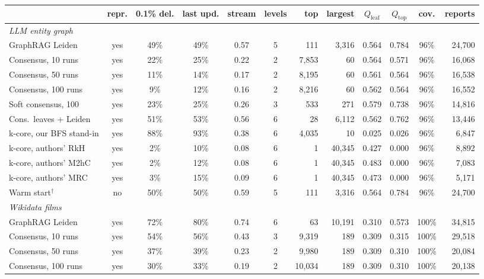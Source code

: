 \begin{tabular}{l c c c c c r r c c c r}
\toprule
 & repr. & 0.1\% del. & last upd. & stream & levels & top & largest & $Q_\mathrm{leaf}$ & $Q_\mathrm{top}$ & cov. & reports\\
\midrule
\multicolumn{12}{l}{\emph{LLM entity graph}}\\
GraphRAG Leiden & yes & 49\% & 49\% & 0.57 & 5 & 111 & 3{,}316 & 0.564 & 0.784 & 96\% & 24{,}700 \\
Consensus{,} 10 runs & yes & 22\% & 25\% & 0.22 & 2 & 7{,}853 & 60 & 0.564 & 0.571 & 96\% & 16{,}068 \\
Consensus{,} 50 runs & yes & 11\% & 14\% & 0.17 & 2 & 8{,}195 & 60 & 0.561 & 0.564 & 96\% & 16{,}538 \\
Consensus{,} 100 runs & yes & 9\% & 12\% & 0.16 & 2 & 8{,}216 & 60 & 0.562 & 0.564 & 96\% & 16{,}552 \\
Soft consensus{,} 100 & yes & 23\% & 25\% & 0.26 & 3 & 533 & 271 & 0.579 & 0.738 & 96\% & 14{,}816 \\
Cons.\ leaves + Leiden & yes & 51\% & 53\% & 0.56 & 6 & 28 & 6{,}112 & 0.562 & 0.762 & 96\% & 13{,}446 \\
k-core{,} our BFS stand-in & yes & 88\% & 93\% & 0.38 & 6 & 4{,}035 & 10 & 0.025 & 0.026 & 96\% & 6{,}847 \\
k-core{,} authors' RkH & yes & 2\% & 10\% & 0.08 & 6 & 1 & 40{,}345 & 0.427 & 0.000 & 96\% & 8{,}892 \\
k-core{,} authors' M2hC & yes & 2\% & 12\% & 0.08 & 6 & 1 & 40{,}345 & 0.483 & 0.000 & 96\% & 7{,}083 \\
k-core{,} authors' MRC & yes & 3\% & 15\% & 0.09 & 6 & 1 & 40{,}345 & 0.473 & 0.000 & 96\% & 5{,}171 \\
Warm start$^{\dagger}$ & no & 50\% & 50\% & 0.59 & 5 & 111 & 3{,}316 & 0.564 & 0.784 & 96\% & 24{,}700 \\
\midrule
\multicolumn{12}{l}{\emph{Wikidata films}}\\
GraphRAG Leiden & yes & 72\% & 80\% & 0.74 & 6 & 63 & 10{,}191 & 0.310 & 0.573 & 100\% & 34{,}815 \\
Consensus{,} 10 runs & yes & 54\% & 56\% & 0.43 & 3 & 9{,}319 & 189 & 0.309 & 0.315 & 100\% & 29{,}518 \\
Consensus{,} 50 runs & yes & 37\% & 39\% & 0.23 & 2 & 9{,}980 & 189 & 0.309 & 0.310 & 100\% & 20{,}084 \\
Consensus{,} 100 runs & yes & 30\% & 33\% & 0.19 & 2 & 10{,}034 & 189 & 0.309 & 0.310 & 100\% & 20{,}138 \\

\end{tabular}

